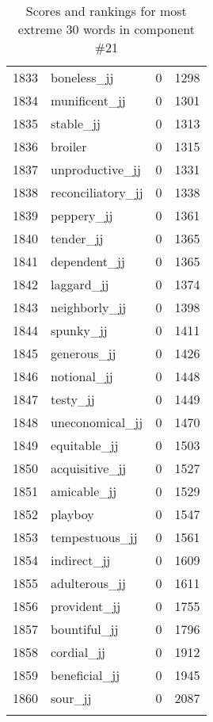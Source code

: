 \begin{longtable}[!htbp]{| rlr@{.}l |}
    1833 & boneless\_jj & 0 & 1298 \\
    1834 & munificent\_jj & 0 & 1301 \\
    1835 & stable\_jj & 0 & 1313 \\
    1836 & broiler & 0 & 1315 \\
    1837 & unproductive\_jj & 0 & 1331 \\
    1838 & reconciliatory\_jj & 0 & 1338 \\
    1839 & peppery\_jj & 0 & 1361 \\
    1840 & tender\_jj & 0 & 1365 \\
    1841 & dependent\_jj & 0 & 1365 \\
    1842 & laggard\_jj & 0 & 1374 \\
    1843 & neighborly\_jj & 0 & 1398 \\
    1844 & spunky\_jj & 0 & 1411 \\
    1845 & generous\_jj & 0 & 1426 \\
    1846 & notional\_jj & 0 & 1448 \\
    1847 & testy\_jj & 0 & 1449 \\
    1848 & uneconomical\_jj & 0 & 1470 \\
    1849 & equitable\_jj & 0 & 1503 \\
    1850 & acquisitive\_jj & 0 & 1527 \\
    1851 & amicable\_jj & 0 & 1529 \\
    1852 & playboy & 0 & 1547 \\
    1853 & tempestuous\_jj & 0 & 1561 \\
    1854 & indirect\_jj & 0 & 1609 \\
    1855 & adulterous\_jj & 0 & 1611 \\
    1856 & provident\_jj & 0 & 1755 \\
    1857 & bountiful\_jj & 0 & 1796 \\
    1858 & cordial\_jj & 0 & 1912 \\
    1859 & beneficial\_jj & 0 & 1945 \\
    1860 & sour\_jj & 0 & 2087 \\
    \hline
    \caption{Scores and rankings for most extreme 30 words in component \#21} \\
\end{longtable}

